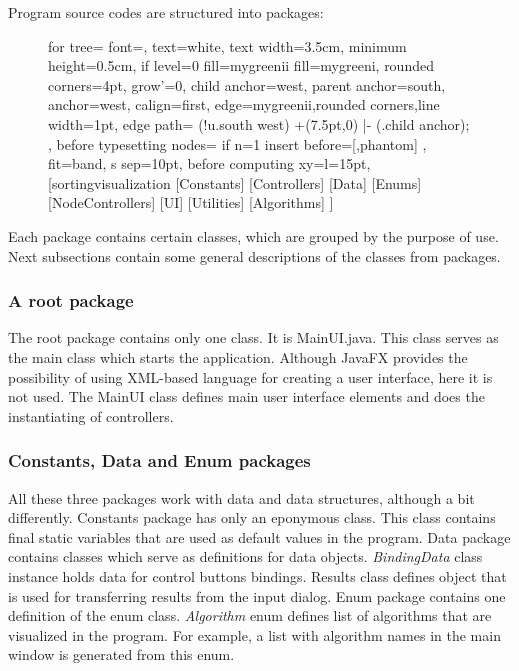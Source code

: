 \documentclass[
  field=inf,
  biblatex,
  language=english,
  glossaries,
  theorems=false,
  sourcecodes=false,
  index
]{kidiplom}
\begin{document}
Program source codes are structured into packages:
\begin{figure}[H]
	\begin{flushleft}
		\begin{forest}
			for tree={
    		font=\sffamily,
    		text=white,
    		text width=3.5cm,
    		minimum height=0.5cm,
    		if level=0
    		  {fill=mygreenii}
    		  {fill=mygreeni},
    		rounded corners=4pt,
    		grow'=0,
    		child anchor=west,
    		parent anchor=south,
    		anchor=west,
    		calign=first,
    		edge={mygreenii,rounded corners,line width=1pt},
    		edge path={
    		  \noexpand{}
    		  (!u.south west) +(7.5pt,0) |- (.child anchor);
		    },
    		before typesetting nodes={
      		if n=1
        		{insert before={[,phantom]}}
        		{}
    		},
    		fit=band,
    		s sep=10pt,
    		before computing xy={l=15pt},
  		}
		[sortingvisualization
		  [Constants]
  		  [Controllers]
		  [Data]
		  [Enums]
		  [NodeControllers]
		  [UI]
		  [Utilities]
		  [Algorithms]
		]
		\end{forest}
	\end{flushleft}
\end{figure}

Each package contains certain classes, which are grouped by the purpose of use. Next subsections contain some general descriptions of the classes from packages. 
\subsubsection{A root package}
The root package contains only one class. It is MainUI.java. This class serves as the main class which starts the application. Although JavaFX provides the possibility of using XML-based language for creating a user interface, here it is not used. The MainUI class defines main user interface elements and does the instantiating of controllers.

\subsubsection{Constants, Data and Enum packages}
All these three packages work with data and data structures, although a bit differently. Constants package has only an eponymous class. This class contains final static variables that are used as default values in the program. Data package contains classes which serve as definitions for data objects. \textit{BindingData} class instance holds data for control buttons bindings. Results class defines object that is used for transferring results from the input dialog. Enum package contains one definition of the enum class. \textit{Algorithm} enum defines list of algorithms that are visualized in the program. For example, a list with algorithm names in the main window is generated from this enum.
\end{document}
